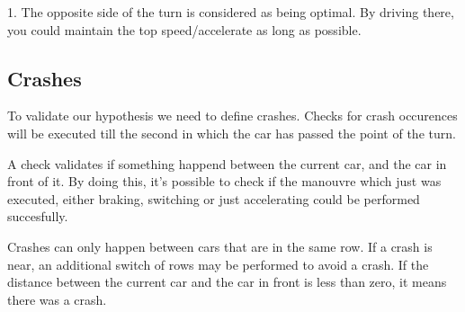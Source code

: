 1. The opposite side of the turn is considered as being optimal. By driving there, you could maintain the top speed/accelerate as long as possible.

\subsection{Crashes}
To validate our hypothesis we need to define crashes. Checks for crash occurences will be executed till the second in which the car has passed the point of the turn.

A check validates if something happend between the current car, and the car in front of it. By doing this, it's possible to check if the manouvre which just was executed, either braking, switching or just accelerating could be performed succesfully.

Crashes can only happen between cars that are in the same row. If a crash is near, an additional switch of rows may be performed to avoid a crash. If the distance between the current car and the car in front is less than zero, it means there was a crash.
